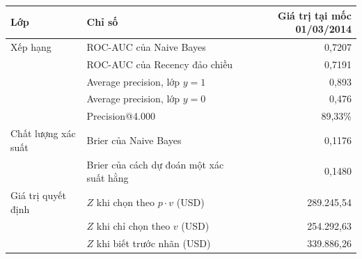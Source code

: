 \begin{tabular}{llr}
\toprule
Lớp & Chỉ số & Giá trị tại mốc 01/03/2014 \\
\midrule
Xếp hạng & ROC-AUC của Naive Bayes & 0,7207 \\
 & ROC-AUC của Recency đảo chiều & 0,7191 \\
 & Average precision, lớp $y=1$ & 0,893 \\
 & Average precision, lớp $y=0$ & 0,476 \\
 & Precision@4.000 & 89,33\% \\
Chất lượng xác suất & Brier của Naive Bayes & 0,1176 \\
 & Brier của cách dự đoán một xác suất hằng & 0,1480 \\
Giá trị quyết định & $Z$ khi chọn theo $p\cdot v$ (USD) & 289.245,54 \\
 & $Z$ khi chỉ chọn theo $v$ (USD) & 254.292,63 \\
 & $Z$ khi biết trước nhãn (USD) & 339.886,26 \\
\bottomrule
\end{tabular}
